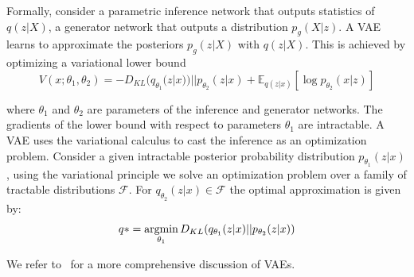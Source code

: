 Formally, consider a parametric inference network that outputs statistics of $q(z|X)$, a generator network that outputs a distribution $p_g(X|z)$. A VAE learns to approximate the posteriors $p_g(z|X)$ with $q(z|X)$. This is achieved by optimizing a variational lower bound
\begin{equation}
    V(x; \theta_1,\theta_2) = - D_{KL}(q_{\theta_1} (z|x)) || p_{\theta_2} (z|x) + \mathbb{E}_{q(z|x)} [\log p_{\theta_2} (x|z)]
\end{equation}

where $\theta_1$ and $\theta_2$ are parameters of the inference and generator networks. The gradients of the lower bound with respect to parameters $\theta_1$ are intractable. A VAE uses the variational calculus to cast the inference as an optimization problem. Consider a given intractable posterior probability distribution $p_{\theta_1}(z|x)$, using the variational principle we solve an optimization problem over a family of tractable distributions $\mathcal{F}$. For $q_{\theta_2}(z|x) \in \mathcal{F}$ the optimal approximation is given by:
\begin{equation}
    q\ast = \operatorname*{argmin}_{\theta_1} D_{KL} (q_{\theta_1}(z|x) || p_{\theta_2}(z|x))
\end{equation}

We refer to~\cite{doersch2016tutorial} for a more comprehensive discussion of VAEs.

